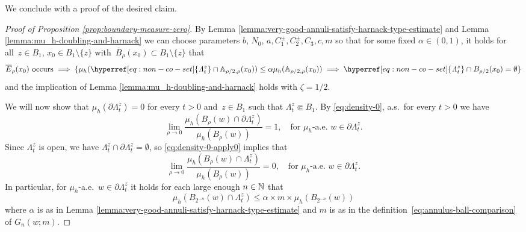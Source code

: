 \documentclass[12pt]{amsart}
\numberwithin{equation}{section}
\newcommand{\cluster}[2]{\hyperref[eq:non-co-set]{\mathit{\Lambda}^{#1}_{#2}}}
\begin{document}
	
	We conclude with a proof of the desired claim. 
	
	\begin{proof}[Proof of Proposition \ref{prop:boundary-measure-zero}]
		By Lemma \ref{lemma:very-good-annuli-satisfy-harnack-type-estimate} 
		and Lemma \ref{lemma:mu_h-doubling-and-harnack}
		we can choose parameters $b$, $N_0$, $a,C^{\pm}_1, C^{\pm}_2, C_3, c, m$
		so that for some fixed $\alpha \in (0,1)$, it holds for all~$z \in B_{1}$, $x_0 \in B_1 \setminus \{z\}$ with~$\overline{B}_{\rho}(x_0) \subset B_1 \setminus \{z\}$ that
		\begin{equation} \label{eq:good-annulus-implies-harnack}
		\mbox{$\overline E_{\rho}(x_0)$ occurs} \implies  \{ 		\mu_h({\cluster{z}{t}} \cap \A_{\rho/2, \rho}(x_0)) \leq \alpha \mu_h(\A_{\rho/2, \rho}(x_0)) \implies {\cluster{z}{t}} \cap B_{\rho/2}(x_0) = \emptyset \}
		\end{equation}
		and the implication of Lemma \ref{lemma:mu_h-doubling-and-harnack}
		holds with $\zeta = 1/2$. 
		
		We will now show that $\mu_h(\partial{\cluster{z}{t}}) = 0$ for every $t>0$ and~$z \in B_{1}$ such that ${\cluster{z}{t}} \Subset B_1$. By \eqref{eq:density-0}, a.s.\ for every $t>0$ we have
		\begin{equation} \label{eq:density-0-apply0}
		\lim_{\rho \to 0} \frac{\mu_h(B_{\rho}(w) \cap \partial {\cluster{z}{t}})}{\mu_h(B_{\rho}(w))} = 1, \quad \text{for $\mu_h$-a.e.\ $w\in \partial {\cluster{z}{t}}$} .
		\end{equation}		
		Since ${\cluster{z}{t}}$ is open, we have ${\cluster{z}{t}} \cap \partial {\cluster{z}{t}} = \emptyset$, so \eqref{eq:density-0-apply0} implies that
		\begin{equation} \label{eq:density-0-apply}
		\lim_{\rho \to 0} \frac{\mu_h(B_{\rho}(w) \cap {\cluster{z}{t}})}{\mu_h(B_{\rho}(w))} = 0 , \quad \text{for $\mu_h$-a.e.\ $w\in \partial {\cluster{z}{t}}$} .
		\end{equation}
		In particular, for $\mu_h$-a.e.\ $w\in \partial {\cluster{z}{t}}$ it holds for each large enough $n\in\mathbb{N}$ that
		\begin{equation} \label{eq:density-theorem-apply}
		\mu_h(B_{2^{-n}}(w) \cap {\cluster{z}{t}}) \leq  \alpha \times m \times \mu_h(B_{2^{-n}}(w))  
		\end{equation} 
		where $\alpha$ is as in Lemma \ref{lemma:very-good-annuli-satisfy-harnack-type-estimate} and $m$ is as in the definition~\eqref{eq:annulus-ball-comparison} of $G_n(w; m)$.
		

\end{proof}
\end{document}
